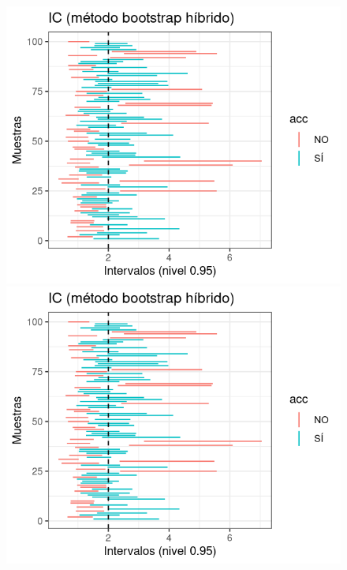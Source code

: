 \documentclass[a4paper]{article}
\begin{document}
    \begin{figure}[H]
  \includegraphics[width=\linewidth]{media/rexp-hybrid.png}

\endminipage\hfill
{}
  \includegraphics[width=\linewidth]{media/rexp-hybrid.png}


\end{figure}
\end{document}
